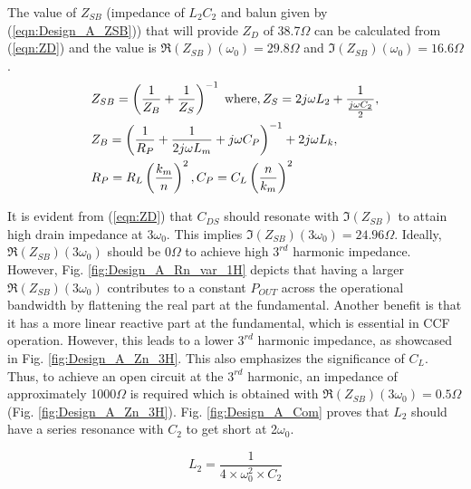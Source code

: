 \documentclass[conference]{IEEEtran}
\begin{document}
The value of $Z_{SB}$ (impedance of $L_2C_2$ and balun given by (\ref{eqn:Design_A_ZSB})) that will provide $Z_D$ of 38.7$\Omega$ can be calculated from (\ref{eqn:ZD}) and the value is $\Re(Z_{SB})(\omega_0) =  29.8\Omega$ and $\Im(Z_{SB})(\omega_0) = 16.6\Omega$.
\vspace{-0.05in}
\begin{equation}
\begin{aligned}
    &Z_{SB}=\left(\frac{1}{Z_B}+\frac{1}{Z_S}\right)^{-1}
    \hspace{1mm}\text{where}, Z_S=2j\omega  L_2+\frac{1}{\frac{j \omega C_2}{2}}, \\
    &Z_B=\left(\frac{1}{R_P}+\frac{1}{2j \omega  L_m}+j \omega C_P\right)^{-1}+2j \omega  L_k,\\ &R_P=R_L\left(\frac{k_m}{n}\right)^2,C_P=C_L\left(\frac{n}{k_m}\right)^2
\label{eqn:Design_A_ZSB}
\end{aligned}
\end{equation}

It is evident from (\ref{eqn:ZD}) that $C_{DS}$ should resonate with $\Im(Z_{SB})$ to attain high drain impedance at $3\omega_0$. This implies $\Im(Z_{SB})(3\omega_0) = 24.96\Omega$. Ideally, $\Re(Z_{SB})(3\omega_0)$ should be $0\Omega$ to achieve high $3^{rd}$ harmonic impedance. However, Fig. \ref{fig:Design_A_Rn_var_1H} depicts that having a larger $\Re(Z_{SB})(3\omega_0)$ contributes to a constant $P_{OUT}$ across the operational bandwidth by flattening the real part at the fundamental. Another benefit is that it has a  more linear reactive part at the fundamental, which is essential in CCF operation.
However, this leads to a lower $3^{rd}$ harmonic impedance, as showcased in Fig. \ref{fig:Design_A_Zn_3H}. This also emphasizes  the significance of $C_L$. Thus, to achieve an open circuit at the $3^{rd}$ harmonic, an impedance of approximately 1000$\Omega$ is required which is obtained with  $\Re(Z_{SB})(3\omega_0) = 0.5\Omega$ (Fig. \ref{fig:Design_A_Zn_3H}). Fig. \ref{fig:Design_A_Com} proves that $L_2$ should have a series resonance with $C_2$ to get short at 2$\omega_0$.

\vspace{-0.05in}
\begin{equation}
    L_2=\frac{1}{4\times\omega_0^2\times C_2}%
    \label{eqn:Design_A_2H}
\end{equation}
\end{document}
